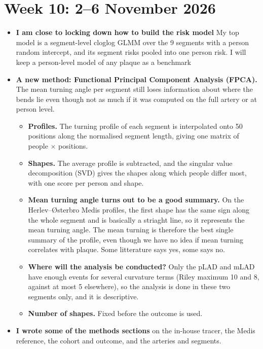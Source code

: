 \documentclass[11pt,a4paper]{article}
\begin{document}

\section{Week 10: 2--6 November 2026}

\sectionprogress

\begin{itemize}
  \item \textbf{I am close to locking down how to build the risk model} My top model is a
    segment-level cloglog GLMM over the 9 segments with a person random intercept, and its
    segment risks pooled into one person risk. I will keep a person-level model of any plaque as a benchmark 
  \item \textbf{A new method: Functional Principal Component Analysis (FPCA).} The mean turning angle per segment still loses information about where the bends lie even though not as much if it was computed on the full artery or at person level.
    \begin{itemize}
      \item \textbf{Profiles.} The turning profile of each segment is interpolated onto 50 positions
        along the normalised segment length, giving one matrix of people $\times$ positions.
      \item \textbf{Shapes.} The average profile is subtracted, and the singular value decomposition (SVD) gives the shapes along
        which people differ most, with one score per person and shape. 
        \item \textbf{Mean turning angle turns out to be a good summary.} On the Herlev--{\O}sterbro
        Medis profiles, the first shape has the same sign along the whole segment and is basically a striaght line, so it represents the mean turning angle. The mean turning is therefore the best single summary of the profile, even though we have no idea if mean turning correlates with plaque. Some litterature says yes, some says no. 
      \item \textbf{Where will the analysis be conducted?} Only the pLAD and mLAD have enough events for several curvature terms
        (Riley maximum 10 and 8, against at most 5 elsewhere), so the analysis is done in these two
        segments only, and it is descriptive.
      \item \textbf{Number of shapes.} Fixed before the outcome is used. 
    \end{itemize}
  \item \textbf{I wrote some of the methods sections} on the in-house tracer, the Medis reference, the
    cohort and outcome, and the arteries and segments.
\end{itemize}












\end{document}
